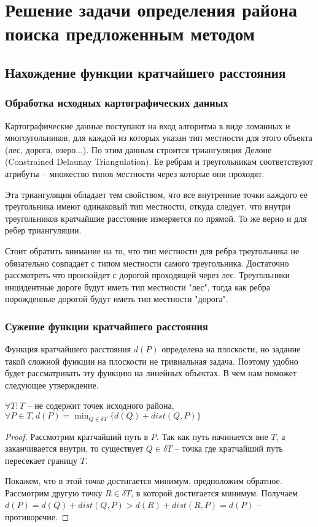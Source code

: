 \everymath{\displaystyle}

\chapter{Решение задачи определения района поиска предложенным методом}
\section{Нахождение функции кратчайшего расстояния}
\subsection{Обработка исходных картографических данных}
Картографические данные поступают на вход алгоритма в
виде ломанных и многоугольников, для каждой из которых указан тип местности
для этого объекта (лес, дорога, озеро...). По этим данным строится триангуляция
Делоне (Constrained Delaunay Triangulation). Ее ребрам и треугольникам
соответствуют атрибуты -- множество типов местности через которые они проходят.


Эта триангуляция обладает тем свойством, что все внутренние точки каждого ее
треугольника имеют одинаковый тип местности, откуда следует, что внутри
треугольников кратчайшие расстояние измеряется по прямой. То же верно и
для ребер триангуляции.

Стоит обратить внимание на то, что тип местности для ребра треугольника
не обязательно совпадает с типом местности самого треугольника. Достаточно
рассмотреть что произойдет с дорогой проходящей через лес. Треугольники
инцидентные дороге будут иметь тип местности "лес", тогда как ребра
порожденные дорогой будут иметь тип местности "дорога".

\FloatBarrier

\subsection{Сужение функции кратчайшего расстояния}
Функция кратчайшего расстояния $d(P)$ определена на плоскости, но
задание такой сложной функции на плоскости не тривиальная задача.
Поэтому удобно будет рассматривать эту функцию на линейных объектах.
В чем нам поможет следующее утверждение.

{\prop\label{sh_path}
$\forall T: T$ -- не содержит точек исходного района,
$\forall P \in T, d(P) = \min_{Q \in \delta T} \{d(Q) + dist(Q, P)\}$}
\begin{proof}
Рассмотрим кратчайший путь в $P$. Так как путь начинается вне $T$,
а заканчивается внутри, то существует $Q \in \delta T$ -- точка
где кратчайший путь пересекает границу $T$.

Покажем, что в этой точке достигается минимум. предположим обратное.
Рассмотрим другую точку $R \in \delta T$, в которой достигается минимум.
Получаем $d(P) = d(Q) + dist(Q, P) > d(R) + dist(R, P) = d(P)$ -- противоречие.
\end{proof}

